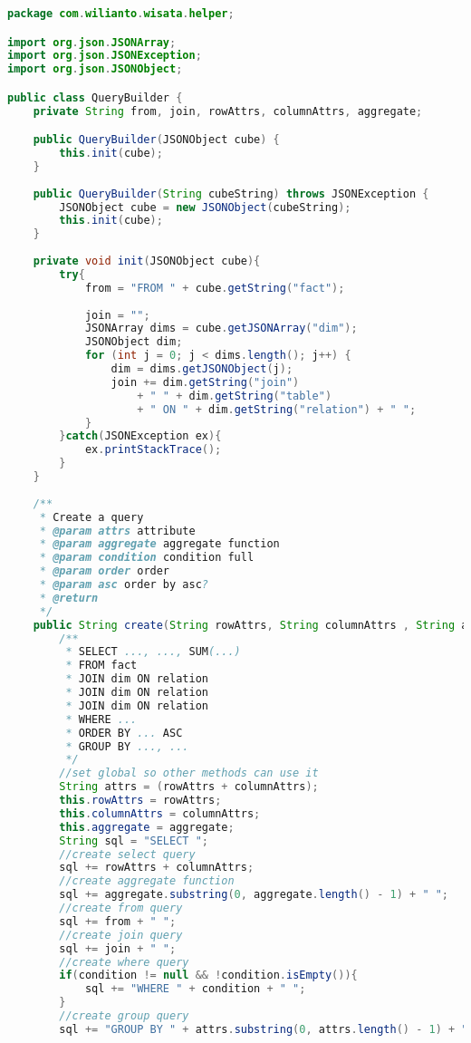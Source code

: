 \begin{lstlisting}[language=Java,basicstyle=\tiny,caption=QueryBuilder.java]
package com.wilianto.wisata.helper;

import org.json.JSONArray;
import org.json.JSONException;
import org.json.JSONObject;

public class QueryBuilder {
    private String from, join, rowAttrs, columnAttrs, aggregate;

    public QueryBuilder(JSONObject cube) {
        this.init(cube);
    }
    
    public QueryBuilder(String cubeString) throws JSONException {
        JSONObject cube = new JSONObject(cubeString);
        this.init(cube);
    }
    
    private void init(JSONObject cube){
        try{
            from = "FROM " + cube.getString("fact");
            
            join = "";
            JSONArray dims = cube.getJSONArray("dim");
            JSONObject dim;
            for (int j = 0; j < dims.length(); j++) {
                dim = dims.getJSONObject(j);
                join += dim.getString("join") 
                    + " " + dim.getString("table") 
                    + " ON " + dim.getString("relation") + " ";
            }
        }catch(JSONException ex){
            ex.printStackTrace();
        }
    }
    
    /**
     * Create a query
     * @param attrs attribute
     * @param aggregate aggregate function
     * @param condition condition full
     * @param order order
     * @param asc order by asc?
     * @return 
     */
    public String create(String rowAttrs, String columnAttrs , String aggregate, String condition, String order, int limit, String having){
        /**
         * SELECT ..., ..., SUM(...)
         * FROM fact
         * JOIN dim ON relation
         * JOIN dim ON relation
         * JOIN dim ON relation
         * WHERE ...
         * ORDER BY ... ASC
         * GROUP BY ..., ...
         */
        //set global so other methods can use it
        String attrs = (rowAttrs + columnAttrs);
        this.rowAttrs = rowAttrs;
        this.columnAttrs = columnAttrs;
        this.aggregate = aggregate;
        String sql = "SELECT ";
        //create select query
        sql += rowAttrs + columnAttrs;
        //create aggregate function
        sql += aggregate.substring(0, aggregate.length() - 1) + " ";
        //create from query
        sql += from + " ";
        //create join query
        sql += join + " ";
        //create where query
        if(condition != null && !condition.isEmpty()){
            sql += "WHERE " + condition + " ";
        }
        //create group query
        sql += "GROUP BY " + attrs.substring(0, attrs.length() - 1) + " ";
        

\end{lstlisting}
